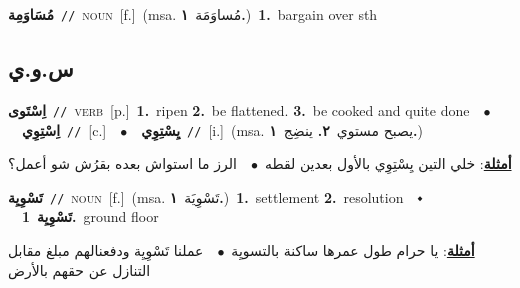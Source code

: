 \documentclass[10pt,a4paper,twoside]{article} %
\begin{document}
\begin{multicols}{2}
{\setlength\topsep{0pt}\textbf{\foreignlanguage{arabic}{مُسَاوَمِة}}\ {\color{gray}\texttt{//}\color{black}}\ \textsc{noun}\ [f.]\ \color{gray}(msa. \foreignlanguage{arabic}{مُساوَمَة}~\foreignlanguage{arabic}{\textbf{١.}})\color{black}\ \textbf{1.}~bargain over sth\ } \vspace{2mm}

\vspace{-3mm}
\subsection*{\color{blue}\foreignlanguage{arabic}{س.و.ي}\color{blue}{}} 

{\setlength\topsep{0pt}\textbf{\foreignlanguage{arabic}{اِسْتَوى}}\ {\color{gray}\texttt{//}\color{black}}\ \textsc{verb}\ [p.]\ \textbf{1.}~ripen  \textbf{2.}~be flattened.  \textbf{3.}~be cooked and quite done\ \ $\bullet$\ \ \setlength\topsep{0pt}\textbf{\foreignlanguage{arabic}{اِسْتِوِي}}\ {\color{gray}\texttt{//}\color{black}}\ [c.]\ \ $\bullet$\ \ \setlength\topsep{0pt}\textbf{\foreignlanguage{arabic}{يِسْتِوِي}}\ {\color{gray}\texttt{//}\color{black}}\ [i.]\ \color{gray}(msa. \foreignlanguage{arabic}{يصبح مستوي}~\foreignlanguage{arabic}{\textbf{٢.}}  \foreignlanguage{arabic}{ينضِج}~\foreignlanguage{arabic}{\textbf{١.}})\color{black}\  \begin{flushright}\color{gray}\foreignlanguage{arabic}{\textbf{\underline{\foreignlanguage{arabic}{أمثلة}}}: خلي التين يِسْتِوِي بالأول بعدين لقطه\ $\bullet$\ \  الرز ما استواش بعده بقرُش شو أعمل؟}\end{flushright}\color{black}} \vspace{2mm}

{\setlength\topsep{0pt}\textbf{\foreignlanguage{arabic}{تَسْوِيِة}}\ {\color{gray}\texttt{//}\color{black}}\ \textsc{noun}\ [f.]\ \color{gray}(msa. \foreignlanguage{arabic}{تَسْوِيَة}~\foreignlanguage{arabic}{\textbf{١.}})\color{black}\ \textbf{1.}~settlement  \textbf{2.}~resolution\ \ $\smblkdiamond$\ \ \setlength\topsep{0pt}\textbf{\foreignlanguage{arabic}{تَسْوِيِة}}\ \textbf{1.}~ground floor\  \begin{flushright}\color{gray}\foreignlanguage{arabic}{\textbf{\underline{\foreignlanguage{arabic}{أمثلة}}}: يا حرام طول عمرها ساكنة بالتسويِة\ $\bullet$\ \  عملنا تَسْوِيِة ودفعنالهم مبلغ  مقابل التنازل عن حقهم بالأرض}\end{flushright}\color{black}} \vspace{2mm}


\end{multicols}
\end{document}
